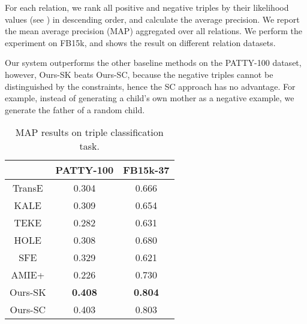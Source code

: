 For each relation, we rank all positive and negative triples
by their likelihood values (see )
in descending order, and calculate the average precision.
We report the mean average precision (MAP) aggregated over all relations.
We perform the experiment on FB15k, and  shows the result on
different relation datasets.

Our system outperforms the other baseline methods on the PATTY-100 dataset,
however, Ours-SK beats Ours-SC, because the negative triples cannot 
be distinguished by the constraints, hence the SC approach has no advantage.
For example, instead of generating a child's own mother as a negative example,
we generate the father of a random child. 



\begin{table}[tbh]
	\small
	\centering
	\caption{MAP results on triple classification task.}
	\begin{tabular}{|c|cc|}
		\hline
							& PATTY-100	&	FB15k-37 	\\
        \hline
		TransE				&	0.304	&	0.666	\\	%
		KALE				&	0.309	&	0.654	\\
		TEKE				&	0.282	&	0.631	\\
		HOLE				&	0.308	&	0.680	\\	%
		SFE					&	0.329	&	0.621	\\	%
		AMIE+				&	0.226	&	0.730	\\	
		\hline
		Ours-SK				&	\textbf{0.408}	&	\textbf{0.804}	\\	
		Ours-SC				&	0.403	&	0.803	\\
		\hline
	\end{tabular}
	\label{tab:triple-clsf}
\end{table}



